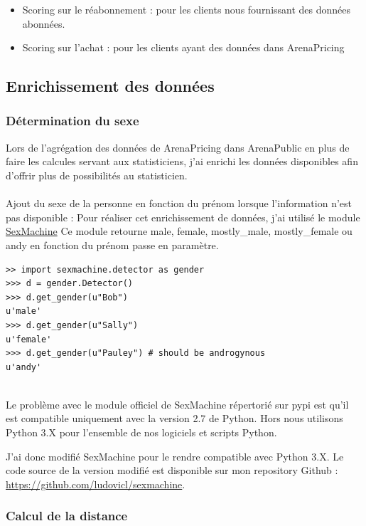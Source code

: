 \begin{itemize}
  \item[\textbullet] Scoring sur le réabonnement : pour les clients nous fournissant des données abonnées. 
  \item[\textbullet] Scoring sur l'achat : pour les clients ayant des données dans ArenaPricing  
\end{itemize} 

\subsection{Enrichissement des données}
\subsubsection{Détermination du sexe}

Lors de l'agrégation des données de ArenaPricing dans ArenaPublic en plus de faire les calcules servant aux statisticiens, j'ai enrichi les données disponibles afin d'offrir plus de possibilités au statisticien.
\\ \\
Ajout du sexe de la personne en fonction du prénom lorsque l'information n'est pas disponible :
Pour réaliser cet enrichissement de données, j'ai utilisé le module 
\href{https://github.com/ferhatelmas/sexmachine/}{SexMachine}
Ce module retourne male, female, mostly\_male, mostly\_female ou andy en fonction du prénom passe en paramètre.

\lstset{style=custompython}
\begin{lstlisting}
>> import sexmachine.detector as gender
>>> d = gender.Detector()
>>> d.get_gender(u"Bob")
u'male'
>>> d.get_gender(u"Sally")
u'female'
>>> d.get_gender(u"Pauley") # should be androgynous
u'andy'
\end{lstlisting}
\leavevmode \\
Le problème avec le module officiel de SexMachine répertorié sur pypi est qu'il est compatible uniquement avec la version 2.7 de Python. Hors nous utilisons Python 3.X pour l'ensemble de nos logiciels et scripts Python. 

J'ai donc modifié SexMachine pour le rendre compatible avec Python 3.X. Le code source de la version modifié est disponible sur mon repository Github : \href{https://github.com/ludovicl/sexmachine}{https://github.com/ludovicl/sexmachine}.

\subsubsection{Calcul de la distance}

